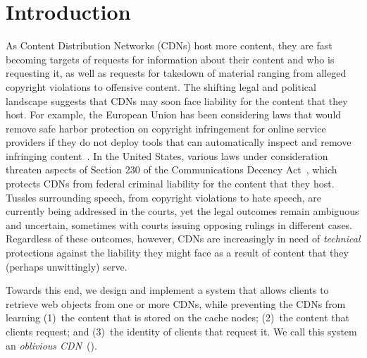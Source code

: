 \section{Introduction}
\label{sec:intro}


As Content Distribution Networks (CDNs) host more content,
they are fast becoming targets of requests for information about their content
and who is requesting it, as well as requests for takedown of material ranging
from alleged copyright violations to offensive content. The shifting legal and
political landscape suggests that CDNs may soon face liability for the content
that they host. For example, the European Union has been considering laws that
would remove safe harbor protection on copyright infringement for online
service providers if they do not deploy tools that can automatically inspect
and remove infringing content~\cite{eu-copyright}. In the United States,
various laws under consideration threaten aspects of Section 230 of the
Communications Decency Act~\cite{sec230}, which protects CDNs from federal
criminal liability for the content that they host. Tussles surrounding speech,
from copyright violations to hate speech, are currently being addressed in the
courts, yet the legal outcomes remain ambiguous and uncertain, sometimes with
courts issuing opposing rulings in different cases. Regardless of these
outcomes, however, CDNs are increasingly in need of {\em technical}
protections against the liability they might face as a result of content that
they (perhaps unwittingly) serve.

Towards this end, we design and implement a system that allows clients to
retrieve web objects from one or more CDNs, while preventing the CDNs from
learning (1)~the content that is stored on the cache nodes; (2)~the content
that clients request; and (3)~the identity of clients that request it. We call this system an {\em oblivious CDN}~(\system{}).%

